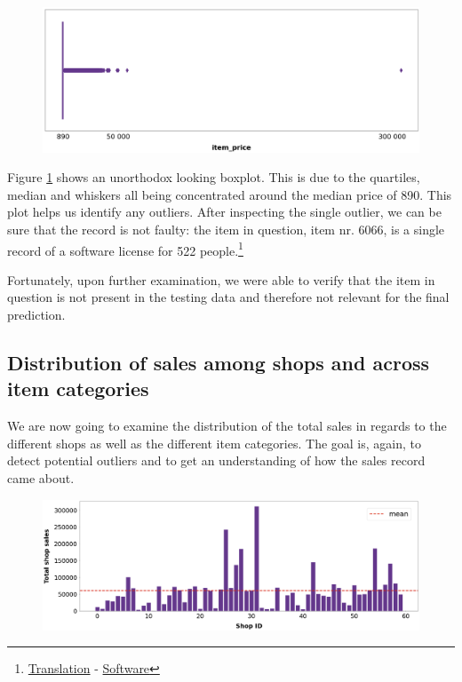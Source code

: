 \begin{figure}[h]
  \centering
  \includegraphics[width=0.78\linewidth]{external_content/graphs/outliers-item_price.png}
  \captionsetup{justification=centering}
  \label{fig:item_price_outliers}
\end{figure}

\vspace*{-4mm}
Figure \ref{fig:item_price_outliers} shows an unorthodox looking boxplot. This is due to the quartiles, median and whiskers all being concentrated around the median price of 890. This plot helps us identify any outliers. After inspecting the single outlier, we can be sure that the record is not faulty: the item in question, item nr. 6066, is a single record of a software license for 522 people.\footnote{\href{https://translate.google.com/?sl=ru&tl=en&text=Radmin\%203\%20\%20-\%20522\%20\%D0\%BB\%D0\%B8\%D1\%86.&op=translate }{Translation} - \href{https://www.radmin.com/ordering/}{Software}}

Fortunately, upon further examination, we were able to verify that the item in question is not present in the testing data and therefore not relevant for the final prediction.

\subsection{Distribution of sales among shops and across item categories}

We are now going to examine the distribution of the total sales in regards to the different shops as well as the different item categories. The goal is, again, to detect potential outliers and to get an understanding of how the sales record came about.

\begin{figure}[h]
  \centering
  \includegraphics[width=0.78\linewidth]{external_content/graphs/distribution_amongst_shops.png}
  \captionsetup{justification=centering}
  \label{fig:distribution_amongst_shops}
\end{figure}

